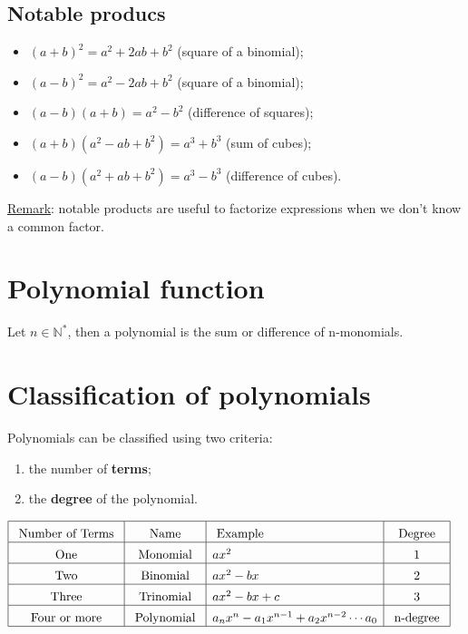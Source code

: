 \documentclass{article}
\begin{document}
\subsection{Notable producs}
\begin{itemize}
    \item $(a+b)^2=a^2+2ab+b^2$ (square of a binomial);
    \item $(a-b)^2=a^2-2ab+b^2$ (square of a binomial);
    \item $(a-b)(a+b)=a^2-b^2$ (difference of squares);
    \item $(a+b)(a^2-ab+b^2)=a^3+b^3$ (sum of cubes);
    \item $(a-b)(a^2+ab+b^2)=a^3-b^3$ (difference of cubes).
\end{itemize}

\underline{Remark}: notable products are useful to factorize expressions when we don't know a common factor.

\newpage
\section{Polynomial function}
Let $n \in \mathbb{N^*}$, then a polynomial is the sum or difference of n-monomials. 

\section{Classification of polynomials}
Polynomials can be classified using two criteria: 
\begin{enumerate}
    \item the number of \textbf{terms};
    \item the \textbf{degree} of the polynomial.
\end{enumerate}
\begin{center}
    $\begin{aligned}
        &\begin{array}{|c|c|l|c|}
        \hline \rule{0pt}{13pt} \text { Number of Terms } & \text { Name } & \text { Example } & \text { Degree } \\
        \hline \rule{0pt}{13pt} \text { One } & \text { Monomial } & ax^2 & \text { 1 } \\
        \hline \rule{0pt}{13pt} \text { Two } & \text { Binomial } & ax^2-b x & \text { 2 } \\
        \hline \rule{0pt}{13pt} \text { Three } & \text { Trinomial } & ax^2-b x+c & \text { 3 } \\
        \hline \rule{0pt}{13pt} \text { Four or more } & \text { Polynomial } & a_n x^n-a_1 x^{n-1}+a_2x^{n-2}\cdots a_0& \text { n-degree } \\
        \hline
        \end{array}
    \end{aligned}$
\end{center}
\vspace*{.3cm}
\end{document}
